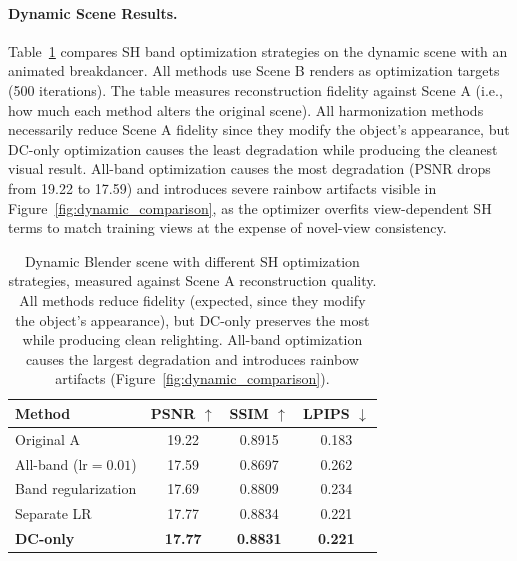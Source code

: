 \documentclass[10pt,twocolumn,letterpaper]{article}
\begin{document}
\paragraph{Dynamic Scene Results.}
Table~\ref{tab:dynamic_results} compares SH band optimization strategies on the dynamic scene with an animated breakdancer. All methods use Scene B renders as optimization targets (500 iterations). The table measures reconstruction fidelity against Scene A (i.e., how much each method alters the original scene). All harmonization methods necessarily reduce Scene A fidelity since they modify the object's appearance, but DC-only optimization causes the least degradation while producing the cleanest visual result. All-band optimization causes the most degradation (PSNR drops from 19.22 to 17.59) and introduces severe rainbow artifacts visible in Figure~\ref{fig:dynamic_comparison}, as the optimizer overfits view-dependent SH terms to match training views at the expense of novel-view consistency.

\begin{table}[t]
\centering
\small
\begin{tabular}{lccc}
\toprule
Method & PSNR $\uparrow$ & SSIM $\uparrow$ & LPIPS $\downarrow$ \\
\midrule
Original A & 19.22 & 0.8915 & 0.183 \\
All-band ($\text{lr}=0.01$) & 17.59 & 0.8697 & 0.262 \\
Band regularization & 17.69 & 0.8809 & 0.234 \\
Separate LR & 17.77 & 0.8834 & 0.221 \\
\textbf{DC-only} & \textbf{17.77} & \textbf{0.8831} & \textbf{0.221} \\
\bottomrule
\end{tabular}
\caption{Dynamic Blender scene with different SH optimization strategies, measured against Scene A reconstruction quality. All methods reduce fidelity (expected, since they modify the object's appearance), but DC-only preserves the most while producing clean relighting. All-band optimization causes the largest degradation and introduces rainbow artifacts (Figure~\ref{fig:dynamic_comparison}).}
\label{tab:dynamic_results}
\end{table}
\end{document}
